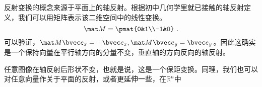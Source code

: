 反射变换的概念来源于平面上的轴反射。根据初中几何学里就已接触的轴反射定义，我们可以用矩阵表示该二维空间中的线性变换。
\begin{equation}
\mat M=\pmat{0&1\\-1&0}~.
\end{equation}
可以验证，$\mat M\bvec e_x=-\bvec e_x,\mat M \bvec e_y=\bvec e_y$。因此这确实是一个保持向量在平行轴方向的分量不变，垂直轴的方向反向的轴反射。

任意图像在轴反射后形状不变，也就是说，这是一个保距变换。同理，我们也可以对任意向量作关于平面的反射，或者更延伸一些，在$\mathbb R^n$中

